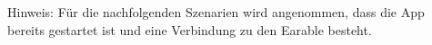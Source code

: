 \documentclass[a4paper,12pt]{article}
\begin{document}
\begin{figure}
   \hfill
\end{figure}
\FloatBarrier

Hinweis: Für die nachfolgenden Szenarien wird angenommen, dass die App bereits gestartet ist und eine Verbindung zu den Earable besteht.
\end{document}
